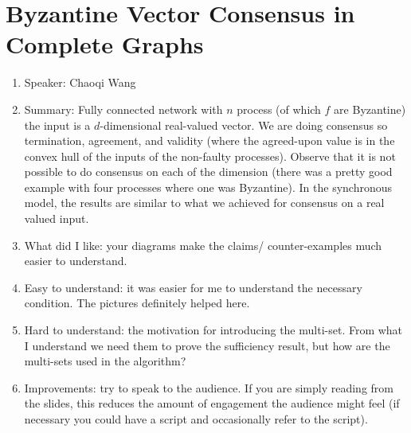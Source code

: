 \documentclass[twoside]{article}
\begin{document}
\section{Byzantine Vector Consensus in Complete Graphs}
\begin{enumerate}
\item Speaker: Chaoqi Wang
\item Summary: Fully connected network with $n$ process (of which $f$ are Byzantine) the input is a $d$-dimensional real-valued vector. We are doing consensus so termination, agreement, and validity (where the agreed-upon value is in the convex hull of the inputs of the non-faulty processes). Observe that it is not possible to do consensus on each of the dimension (there was a pretty good example with four processes where one was Byzantine). In the synchronous model, the results are similar to what we achieved for consensus on a real valued input. 
\item What did I like: your diagrams make the claims/ counter-examples much easier to understand. 
\item Easy to understand: it was easier for me to understand the necessary condition. The pictures definitely helped here. 
\item Hard to understand: the motivation for introducing the multi-set. From what I understand we need them to prove the sufficiency result, but how are the multi-sets used in the algorithm? 
\item Improvements: try to speak to the audience. If you are simply reading from the slides, this reduces the amount of engagement the audience might feel (if necessary you could have a script and occasionally refer to the script). 
\end{enumerate}
\end{document}

